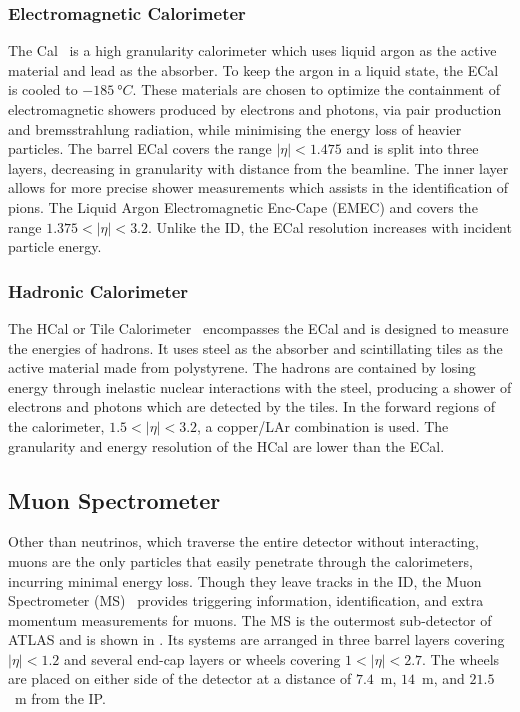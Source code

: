 \subsubsection{Electromagnetic Calorimeter}

The Cal~\cite{ATLASECal} is a high granularity calorimeter which uses liquid argon as the active material and lead as the absorber.
To keep the argon in a liquid state, the ECal is cooled to $-185~\unit{\degree C}$.
These materials are chosen to optimize the containment of electromagnetic showers produced by electrons and photons, via pair production and bremsstrahlung radiation, while minimising the energy loss of heavier particles.
The barrel ECal covers the range $|\eta| < 1.475$ and is split into three layers, decreasing in granularity with distance from the beamline.
The inner layer allows for more precise shower measurements which assists in the identification of pions.
The Liquid Argon Electromagnetic Enc-Cape (EMEC) and covers the range $1.375 < |\eta| < 3.2$.
Unlike the ID, the ECal resolution increases with incident particle energy.

\subsubsection{Hadronic Calorimeter}

The HCal or Tile Calorimeter~\cite{ATLASHCal} encompasses the ECal and is designed to measure the energies of hadrons.
It uses steel as the absorber and scintillating tiles as the active material made from polystyrene.
The hadrons are contained by losing energy through inelastic nuclear interactions with the steel, producing a shower of electrons and photons which are detected by the tiles.
In the forward regions of the calorimeter, $1.5 < |\eta| < 3.2$, a copper/LAr combination is used.
The granularity and energy resolution of the HCal are lower than the ECal.

\subsection{Muon Spectrometer}

Other than neutrinos, which traverse the entire detector without interacting, muons are the only particles that easily penetrate through the calorimeters, incurring minimal energy loss.
Though they leave tracks in the ID, the Muon Spectrometer (MS)~\cite{ATLASMuon,ATLASRun3} provides triggering information, identification, and extra momentum measurements for muons.
The MS is the outermost sub-detector of ATLAS and is shown in .
Its systems are arranged in three barrel layers covering $|\eta| < 1.2$ and several end-cap layers or wheels covering $1 < |\eta| < 2.7$.
The wheels are placed on either side of the detector at a distance of $7.4$~m, $14$~m, and $21.5$~m from the IP.

